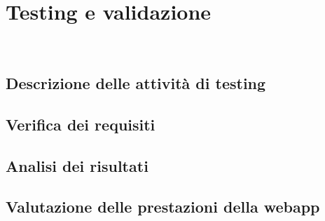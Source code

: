 \chapter{Testing e validazione}
\label{cap:testing}
\\
\section{Descrizione delle attività di testing}

\section{Verifica dei requisiti}

\section{Analisi dei risultati}

\section{Valutazione delle prestazioni della webapp}